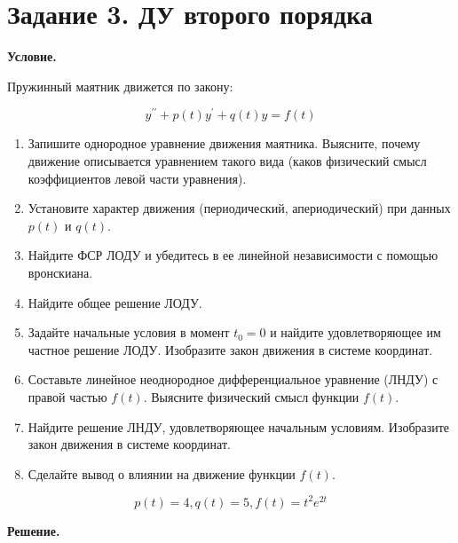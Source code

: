 
\section{Задание 3. ДУ второго порядка}

\textbf{Условие.}

Пружинный маятник движется по закону:

\[y^{\prime\prime} + p(t)y^\prime + q(t)y = f(t)\]

\begin{enumerate}
    \item Запишите однородное уравнение движения маятника. Выясните, почему движение описывается уравнением такого вида (каков физический смысл коэффициентов левой части уравнения).
    \item Установите характер движения (периодический, апериодический) при данных $p(t)$ и $q(t)$.
    \item Найдите ФСР ЛОДУ и убедитесь в ее линейной независимости с помощью вронскиана.
    \item Найдите общее решение ЛОДУ.
    \item Задайте начальные условия в момент $t_0 = 0$ и найдите удовлетворяющее им частное решение ЛОДУ. Изобразите закон движения в системе координат.
    \item Составьте линейное неоднородное дифференциальное уравнение (ЛНДУ) с правой частью $f(t)$. Выясните физический смысл функции $f(t)$.
    \item Найдите решение ЛНДУ, удовлетворяющее начальным условиям. Изобразите закон движения в системе координат.
    \item Сделайте вывод о влиянии на движение функции $f(t)$.
\end{enumerate}

\[p(t) = 4, q(t) = 5, f(t) = t^2 e^{2t}\]

\vspace{10mm}
\textbf{Решение.}

